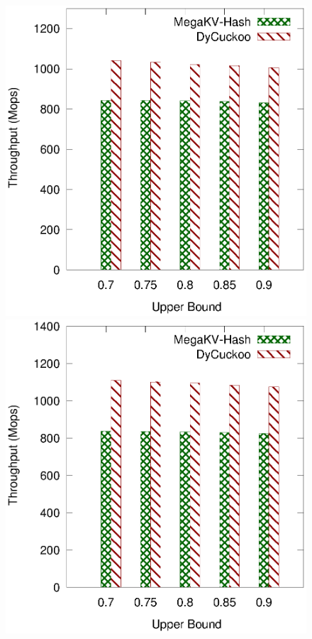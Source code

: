 \begin{figure}[htp]
	\begin{minipage}{0.19\linewidth}\centering
		\includegraphics[width=\linewidth]{pic/dynamic/upper/dynamic_twitter.eps}
		\centerline{\dstwitter}
	\end{minipage}
	\begin{minipage}{0.19\linewidth}\centering
		\includegraphics[width=\linewidth]{pic/dynamic/upper/dynamic_reddit.eps}

\end{minipage}
\end{figure}
